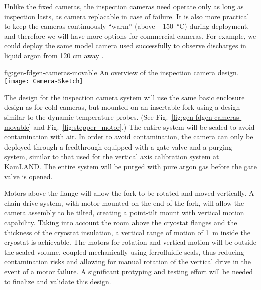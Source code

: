 Unlike the fixed cameras, the inspection cameras need operate only as
long as inspection lasts, as camera replacable in case of failure.  It
is also more practical to keep the cameras continuously ``warm''
(above \SI{-150}{\celsius}) during deployment, and therefore we will
have more options for commercial cameras.  For example, we could
deploy the same model camera used successfully to observe discharges
in liquid argon from 120 cm away \cite{Auger:2015xlo}.

\begin{dunefigure}{fig:gen-fdgen-cameras-movable}
  {An overview of the inspection camera design.}
  \texttt{[image: Camera-Sketch]}%
\end{dunefigure}

The design for the inspection camera system will use the same basic
enclosure design as for cold cameras, but mounted on an insertable
fork using a design similar to the dynamic temperature probes. (See
Fig.\ \ref{fig:gen-fdgen-cameras-movable} and
Fig.\ \ref{fig:stepper_motor}.)  The entire system will be sealed to
avoid contamination with air. In order to avoid contamination, the
camera can only be deployed through a feedthrough equipped with a gate
valve and a purging system, similar to that used for the vertical axis
calibration system at KamLAND\cite{Banks:2014hra}. The entire system
will be purged with pure argon gas before the gate valve is opened.

Motors above the flange will allow the fork to be
rotated and moved vertically.  A chain drive system, with motor
mounted on the end of the fork, will allow the camera assembly to be
tilted, creating a point-tilt mount with vertical motion capability.
Taking into account the room above the cryostat flanges and the
thickness of the cryostat insulation, a vertical range of motion of
\SI{1}{m} inside the cryostat is achievable.
The motors for rotation and vertical motion will be outside the sealed
volume, coupled mechanically using ferrofluidic seals, thus reducing
contamination risks and allowing for manual rotation of the vertical
drive in the event of a motor failure.  A significant protyping and
testing effort will be needed to finalize and validate this design.


